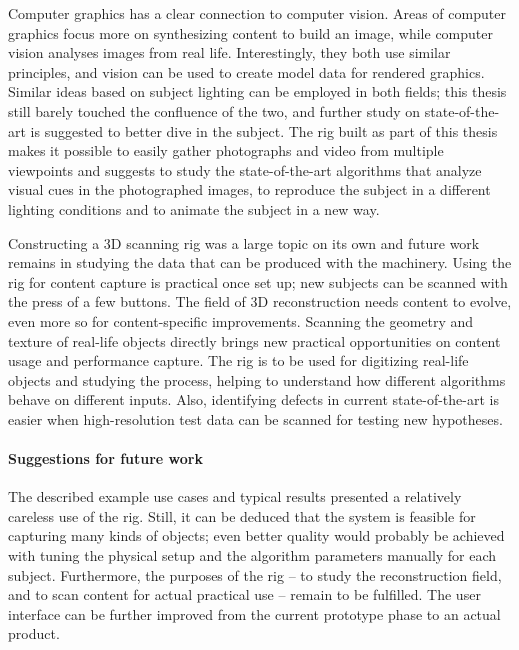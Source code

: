 Computer graphics has a clear connection to computer vision.
Areas of computer graphics focus more on synthesizing content to build an image, while computer vision analyses images from real life.
Interestingly, they both use similar principles, and vision can be used to create model data for rendered graphics.
Similar ideas based on subject lighting can be employed in both fields; this thesis still barely touched the confluence of the two, and further study on state-of-the-art is suggested to better dive in the subject.
The rig built as part of this thesis makes it possible to easily gather photographs and video from multiple viewpoints and suggests to study the state-of-the-art algorithms that analyze visual cues in the photographed images, to reproduce the subject in a different lighting conditions and to animate the subject in a new way.

Constructing a 3D scanning rig was a large topic on its own and future work remains in studying the data that can be produced with the machinery.
Using the rig for content capture is practical once set up; new subjects can be scanned with the press of a few buttons.
The field of 3D reconstruction needs content to evolve, even more so for content-specific improvements.
Scanning the geometry and texture of real-life objects directly brings new practical opportunities on content usage and performance capture.
The rig is to be used for digitizing real-life objects and studying the process, helping to understand how different algorithms behave on different inputs.
Also, identifying defects in current state-of-the-art is easier when high-resolution test data can be scanned for testing new hypotheses.


\paragraph{Suggestions for future work}
The described example use cases and typical results presented a relatively careless use of the rig.
Still, it can be deduced that the system is feasible for capturing many kinds of objects; even better quality would probably be achieved with tuning the physical setup and the algorithm parameters manually for each subject.
Furthermore, the purposes of the rig -- to study the reconstruction field, and to scan content for actual practical use -- remain to be fulfilled.
The user interface can be further improved from the current prototype phase to an actual product.

